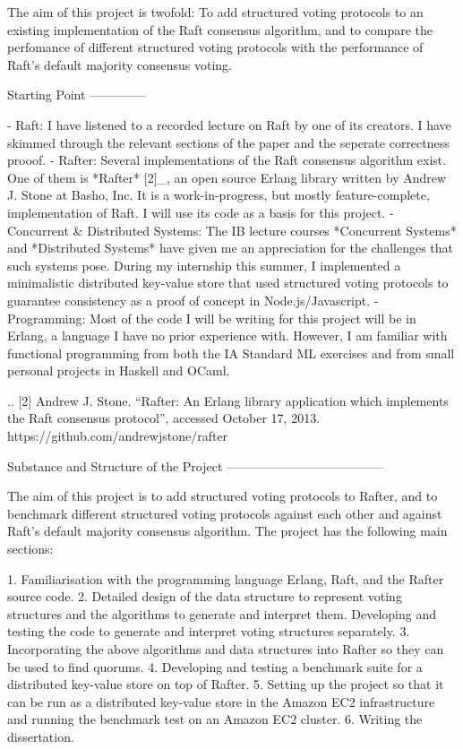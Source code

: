 The aim of this project is twofold: To add structured voting protocols to an existing implementation of the Raft consensus algorithm, and to compare the perfomance of different structured voting protocols with the performance of Raft's default majority consensus voting.

Starting Point
--------------

- Raft: I have listened to a recorded lecture on Raft by one of its creators. I have skimmed through the relevant sections of the paper and the seperate correctness prooof.
- Rafter: Several implementations of the Raft consensus algorithm exist. One of them is *Rafter* [2]_, an open source Erlang library written by Andrew J. Stone at Basho, Inc. It is a work-in-progress, but mostly feature-complete, implementation of Raft. I will use its code as a basis for this project.
- Concurrent & Distributed Systems: The IB lecture courses *Concurrent Systems* and *Distributed Systems* have given me an appreciation for the challenges that such systems pose. During my internship this summer, I implemented a minimalistic distributed key-value store that used structured voting protocols to guarantee consistency as a proof of concept in Node.js/Javascript.
- Programming: Most of the code I will be writing for this project will be in Erlang, a language I have no prior experience with. However, I am familiar with functional programming from both the IA Standard ML exercises and from small personal projects in Haskell and OCaml.

.. [2] Andrew J. Stone. “Rafter: An Erlang library application which implements the Raft consensus protocol”, accessed October 17, 2013. https://github.com/andrewjstone/rafter

Substance and Structure of the Project
--------------------------------------

The aim of this project is to add structured voting protocols to Rafter, and to benchmark different structured voting protocols against each other and against Raft's default majority consensus algorithm. The project has the following main sections:

1. Familiarisation with the programming language Erlang, Raft, and the Rafter source code.
2. Detailed design of the data structure to represent voting structures and the algorithms to generate and interpret them. Developing and testing the code to generate and interpret voting structures separately.
3. Incorporating the above algorithms and data structures into Rafter so they can be used to find quorums.
4. Developing and testing a benchmark suite for a distributed key-value store on top of Rafter.
5. Setting up the project so that it can be run as a distributed key-value store in the Amazon EC2 infrastructure and running the benchmark test on an Amazon EC2 cluster.
6. Writing the dissertation.

